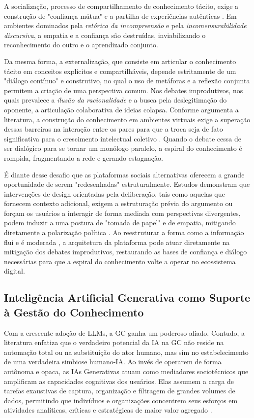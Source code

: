 \documentclass[conference]{IEEEtran} \IEEEoverridecommandlockouts %
\begin{document}
A socialização, processo de compartilhamento de conhecimento tácito, exige a construção de "confiança mútua" e a partilha de experiências autênticas \cite{nonaka1994dynamic}. Em ambientes dominados pela \textit{retórica da incompreensão} e pela \textit{incomensurabilidade discursiva}, a empatia e a confiança são destruídas, inviabilizando o reconhecimento do outro e o aprendizado conjunto. 

Da mesma forma, a externalização, que consiste em articular o conhecimento tácito em conceitos explícitos e compartilháveis, depende estritamente de um "diálogo contínuo" e construtivo, no qual o uso de metáforas e a reflexão conjunta permitem a criação de uma perspectiva comum. Nos debates improdutivos, nos quais prevalece a \textit{ilusão da racionalidade} e a busca pela deslegitimação do oponente, a articulação colaborativa de ideias colapsa. Conforme argumenta a literatura, a construção do conhecimento em ambientes virtuais exige a superação dessas barreiras na interação entre os pares para que a troca seja de fato significativa para o crescimento intelectual coletivo \cite{oktaviaConceptualModelKnowledge2017}. Quando o debate cessa de ser dialógico para se tornar um monólogo paralelo, a espiral do conhecimento é rompida, fragmentando a rede e gerando estagnação.

É diante desse desafio que as plataformas sociais alternativas oferecem a grande oportunidade de serem "redesenhadas" estruturalmente. Estudos demonstram que intervenções de design orientadas pela deliberação, tais como aquelas que fornecem contexto adicional, exigem a estruturação prévia do argumento ou forçam os usuários a interagir de forma mediada com perspectivas divergentes, podem induzir a uma postura de "tomada de papel" e de empatia, mitigando diretamente a polarização política \cite{nelimarkkaReDesignMitigatePolitical2019}. Ao reestruturar a forma como a informação flui e é moderada \cite{kietzmannSocialMediaGet2011}, a arquitetura da plataforma pode atuar diretamente na mitigação dos debates improdutivos, restaurando as bases de confiança e diálogo necessárias para que a espiral do conhecimento volte a operar no ecossistema digital.

\subsection{Inteligência Artificial Generativa como Suporte à Gestão do Conhecimento}

Com a crescente adoção de LLMs, a GC ganha um poderoso aliado. Contudo, a literatura enfatiza que o verdadeiro potencial da IA na GC não reside na automação total ou na substituição do ator humano, mas sim no estabelecimento de uma verdadeira simbiose humano-IA\cite{jarrahiArtificialIntelligenceKnowledge2023}. Ao invés de operarem de forma autônoma e opaca, as IAs Generativas atuam como mediadores sociotécnicos que amplificam as capacidades cognitivas dos usuários. Elas assumem a carga de tarefas exaustivas de captura, organização e filtragem de grandes volumes de dados, permitindo que indivíduos e organizações concentrem seus esforços em atividades analíticas, críticas e estratégicas de maior valor agregado \cite{alghanemiAIKnowledgeManagement2022,taherdoost2023artificial}.
\end{document}
